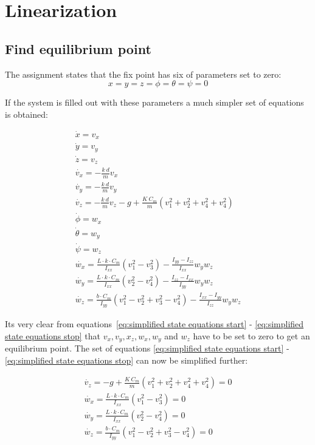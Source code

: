 \section{Linearization}

\subsection{Find equilibrium point}

The assignment states that the fix point has six of parameters set to zero: $$x=y=z=\phi=\theta=\psi=0$$

If the system is filled out with these parameters a much simpler set of equations is obtained:

\begin{eqnarray}
\dot{x}=v_x \\
\label{eq:simplified state equations start}
\dot{y}=v_y \\
\dot{z}=v_z \\
\dot{v_x}=-\frac{k \ d}{m}v_x \\
\dot{v_y}=-\frac{k \ d}{m}v_y \\
\dot{v_z}=-\frac{k \ d}{m}v_z -g + \frac{K \ C_m}{m}(v_1^2+v_2^2+v_4^2+v_4^2)\\
\dot{\phi}=w_x \\
\dot{\theta}=w_y \\
\dot{\psi}=w_z \\
\dot{w_x}=\frac{L \cdot k \cdot C_m}{I_{xx}}(v_1^2 - v_3^2) - \frac{I_{yy}-I_{zz}}{I_{xx}} w_y  w_z \\
\dot{w_y}=\frac{L \cdot k \cdot C_m}{I_{xx}}(v_2^2 - v_4^2) - \frac{I_{zz}-I_{xx}}{I_{yy}} w_y  w_z\\
\dot{w_z}=\frac{b \cdot C_m}{I_{yy}}(v_1^2-v_2^2+v_3^2-v_4^2) - \frac{I_{xx}-I_{yy}}{I_{zz}}w_y  w_z
\label{eq:simplified state equations stop}
\end{eqnarray}

Its very clear from equations~\ref{eq:simplified state equations start} - \ref{eq:simplified state equations stop} that $v_x,v_y,x_z,w_x,w_y$ and $w_z$ have to be set to zero to get an equilibrium point.  The set of equations \ref{eq:simplified state equations start} - \ref{eq:simplified state equations stop} can now be simplified further: 

\begin{eqnarray}
\dot{v_z}= -g + \frac{K \ C_m}{m}(v_1^2+v_2^2+v_4^2+v_4^2) =0\\
\dot{w_x}=\frac{L \cdot k \cdot C_m}{I_{xx}}(v_1^2 - v_3^2) =0 \\
\dot{w_y}=\frac{L \cdot k \cdot C_m}{I_{xx}}(v_2^2 - v_4^2) =0\\
\dot{w_z}=\frac{b \cdot C_m}{I_{yy}}(v_1^2-v_2^2+v_3^2-v_4^2) =0
\end{eqnarray}

